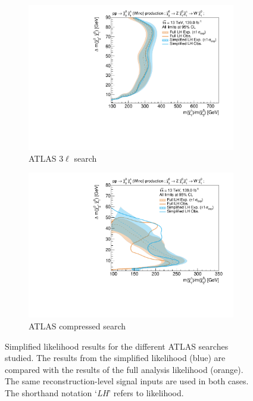 \begin{figure}
\begin{subfigure}[b]{0.5\textwidth}
		\centering\includegraphics[width=\textwidth]{exclusion_3Loffshell_noLabel_v2}
		\caption{ATLAS $3\ell$ search\label{fig:results_3Loffshell}}
	\end{subfigure}\hfill
	\begin{subfigure}[b]{0.5\textwidth}
		\centering\includegraphics[width=\textwidth]{exclusion_compressed_noLabel_v2}
		\caption{ATLAS compressed search~\cite{SUSY-2018-16}\label{fig:results_compressed}}
	\end{subfigure}\hfill
	\caption{Simplified likelihood results for the different ATLAS searches studied. The results from the simplified likelihood (blue) are compared with the results of the full analysis likelihood (orange). The same reconstruction-level signal inputs are used in both cases. The shorthand notation `\textit{LH}' refers to likelihood.}\label{fig:results_analyses}
\end{figure}

